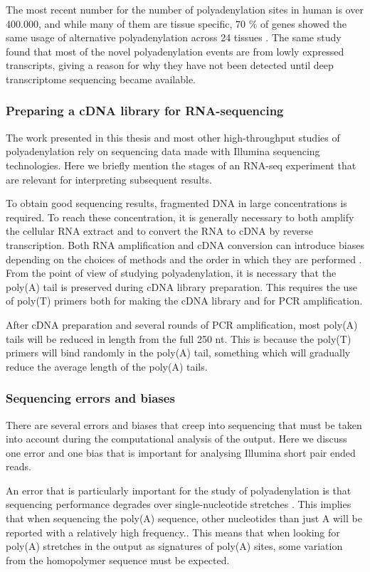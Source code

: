 The most recent number for the number of polyadenylation sites in human is over
400.000, and while many of them are tissue specific, 70 \% of genes showed the
same usage of alternative polyadenylation across 24 tissues
\cite{derti_quantitative_2012}. The same study found that most of the novel
polyadenylation events are from lowly expressed transcripts, giving a reason
for why they have not been detected until deep transcriptome sequencing became
available. 

\subsubsection{Preparing a cDNA library for RNA-sequencing}
The work presented in this thesis and most other high-throughput studies of
polyadenylation rely on sequencing data made with Illumina sequencing
technologies. Here we briefly mention the stages of an RNA-seq
experiment that are relevant for interpreting subsequent results.

To obtain good sequencing results, fragmented DNA in large concentrations is
required. To reach these concentration, it is generally necessary to both
amplify the cellular RNA extract and to convert the RNA to cDNA by reverse
transcription. Both RNA amplification and cDNA conversion can introduce biases
depending on the choices of methods and the order in which they are performed
\cite{wang_rna-seq:_2009}. From the point of view of studying polyadenylation,
it is necessary that the poly(A) tail is preserved during cDNA library
preparation. This requires the use of poly(T) primers both for making the cDNA
library and for PCR amplification.

After cDNA preparation and several rounds of PCR amplification, most poly(A)
tails will be reduced in length from the full 250 nt. This is because the
poly(T) primers will bind randomly in the poly(A) tail, something which will
gradually reduce the average length of the poly(A) tails.

\subsubsection{Sequencing errors and biases}
There are several errors and biases that creep into sequencing that must be
taken into account during the computational analysis of the output. Here we
discuss one error and one bias that is important for analysing Illumina short
pair ended reads.

An error that is particularly important for the study of polyadenylation is
that sequencing performance degrades over single-nucleotide stretches
\cite{minoche_evaluation_2011}. This implies that when sequencing the poly(A)
sequence, other nucleotides than just A will be reported with a relatively high
frequency.. This means that when looking for poly(A) stretches in the output as
signatures of poly(A) sites, some variation from the homopolymer sequence must
be expected.

